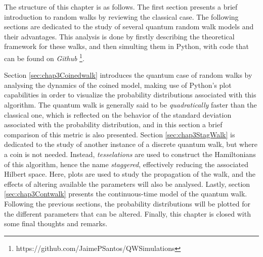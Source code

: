 \documentclass[../../dissertation.tex]{subfiles}
\begin{document}
The structure of this chapter is as follows. The first section presents a brief
introduction to random walks by reviewing the classical case. The following
sections are dedicated to the study of several quantum random walk models and
their advantages. This analysis is done by firstly describing the theoretical
framework for these walks, and then simulting them in Python, with code that
can be found on \textit{Github}
\footnote{https://github.com/JaimePSantos/QWSimulations}.\par 

Section \ref{sec:chap3Coinedwalk} introduces the quantum case of random walks
by analysing the dynamics of the coined model, making use of Python's plot
capabilities in order to visualize the probability distributions associated
with this algorithm. The quantum walk is generally said to be
\textit{quadratically} faster than the classical one, which is reflected on the
behavior of the standard deviation associated with the probability
distribution, and in this section a brief comparison of this metric is also
presented.  Section \ref{sec:chap3StagWalk} is dedicated to the study of
another instance of a discrete quantum walk, but where a coin is not needed.
Instead, \textit{tesselations} are used to construct the Hamiltonians of this
algorithm, hence the name \textit{staggered}, effectively reducing the
associated Hilbert space. Here, plots are used to study the propagation of the
walk, and the effects of altering available the parameters will also be
analysed.  Lastly, section \ref{sec:chap3Contwalk} presents the continuous-time
model of the quantum walk. Following the previous sections, the probability
distributions will be plotted for the different parameters that can be altered.
Finally, this chapter is closed with some final thoughts and remarks.
\end{document}
